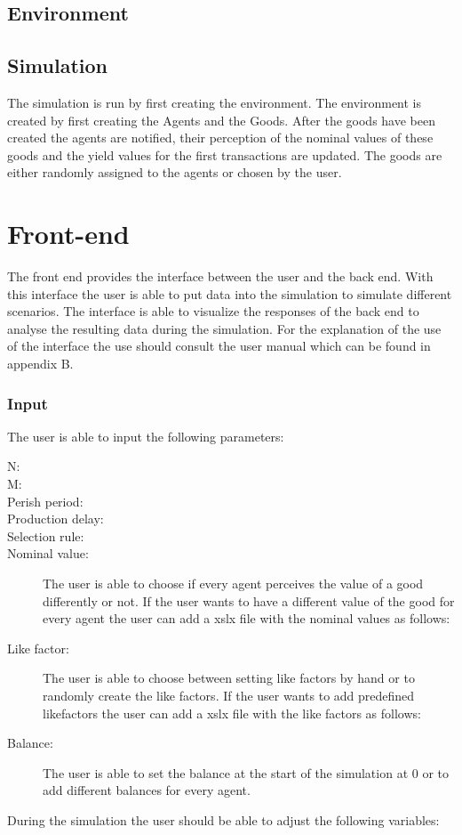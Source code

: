 \documentclass[twoside,openright]{uva-bachelor-thesis}
\begin{document}
\subsection{Environment}

\subsection{Simulation}
The simulation is run by first creating the environment. The environment is created by first creating the Agents and the Goods. After the goods have been created the agents are notified, their perception of the nominal values of these goods and the yield values for the first transactions are updated. The goods are either randomly assigned to the agents or chosen by the user.


\section{Front-end}
The front end provides the interface between the user and the back end. With this interface the user is able to put data into the simulation to simulate different scenarios. The interface is able to visualize the responses of the back end to analyse the resulting data during the simulation. For the explanation of the use of the interface the use should consult the user manual which can be found in appendix B.

\subsubsection{Input}
The user is able to input the following parameters:

\begin{description}
  \item[N:] 
  \item[M:] 
  \item[Perish period:] 
  \item[Production delay:]
 \item[Selection rule:] 
  \item[Nominal value:] The user is able to choose if every agent perceives the value of a good differently or not. If the user wants to have a different value of the good for every agent the user can add a xslx file with the nominal values as follows:
  \item[Like factor:] The user is able to choose between setting like factors by hand or to randomly create the like factors. If the user wants to add predefined likefactors the user can add a xslx file with the like factors as follows:
 \item[Balance:] The user is able to set the balance at the start of the simulation at 0 or to add different balances for every agent.
\end{description}
During the simulation the user should be able to adjust the following variables:
\end{document}
